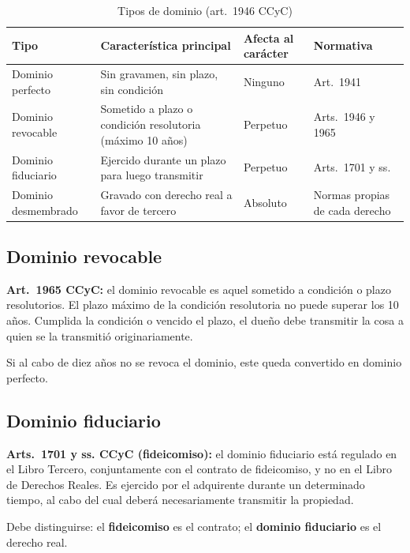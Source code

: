 \documentclass[12pt,oneside]{book}
\begin{document}
\begin{table}[H]
\centering
\caption{Tipos de dominio (art.~1946 CCyC)}
\small
\begin{tabularx}{\textwidth}{
    >{\raggedright\arraybackslash}p{}
    >{\raggedright\arraybackslash}X
    >{\raggedright\arraybackslash}p{}
    >{\raggedright\arraybackslash}p{}
}
\toprule
\textbf{Tipo} & \textbf{Característica principal} & \textbf{Afecta al carácter} & \textbf{Normativa} \\
\midrule
Dominio perfecto & Sin gravamen, sin plazo, sin condición & Ninguno & Art.~1941 \\
Dominio revocable & Sometido a plazo o condición resolutoria (máximo 10 años) & Perpetuo & Arts.~1946 y 1965 \\
Dominio fiduciario & Ejercido durante un plazo para luego transmitir & Perpetuo & Arts.~1701 y ss. \\
Dominio desmembrado & Gravado con derecho real a favor de tercero & Absoluto & Normas propias de cada derecho \\
\bottomrule
\end{tabularx}
\end{table}

\subsection{Dominio revocable}

\textbf{Art.~1965 CCyC:} el dominio revocable es aquel sometido a condición o plazo resolutorios. El plazo máximo de la condición resolutoria no puede superar los 10 años. Cumplida la condición o vencido el plazo, el dueño debe transmitir la cosa a quien se la transmitió originariamente.

Si al cabo de diez años no se revoca el dominio, este queda convertido en dominio perfecto.

\subsection{Dominio fiduciario}

\textbf{Arts.~1701 y ss. CCyC (fideicomiso):} el dominio fiduciario está regulado en el Libro Tercero, conjuntamente con el contrato de fideicomiso, y no en el Libro de Derechos Reales. Es ejercido por el adquirente durante un determinado tiempo, al cabo del cual deberá necesariamente transmitir la propiedad.

\begin{important}
Debe distinguirse: el \textbf{fideicomiso} es el contrato; el \textbf{dominio fiduciario} es el derecho real.
\end{important}
\end{document}
